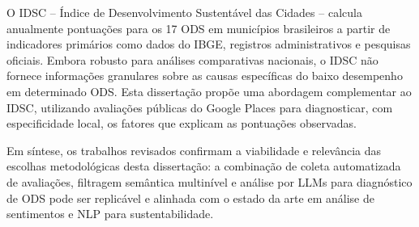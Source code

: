 O IDSC -- Índice de Desenvolvimento Sustentável das Cidades \cite{idsc2024} -- calcula anualmente pontuações para os 17 ODS em municípios brasileiros a partir de indicadores primários como dados do IBGE, registros administrativos e pesquisas oficiais. Embora robusto para análises comparativas nacionais, o IDSC não fornece informações granulares sobre as causas específicas do baixo desempenho em determinado ODS. Esta dissertação propõe uma abordagem complementar ao IDSC, utilizando avaliações públicas do Google Places para diagnosticar, com especificidade local, os fatores que explicam as pontuações observadas.

Em síntese, os trabalhos revisados confirmam a viabilidade e relevância das escolhas metodológicas desta dissertação: a combinação de coleta automatizada de avaliações, filtragem semântica multinível e análise por LLMs para diagnóstico de ODS pode ser replicável e alinhada com o estado da arte em análise de sentimentos e NLP para sustentabilidade.
